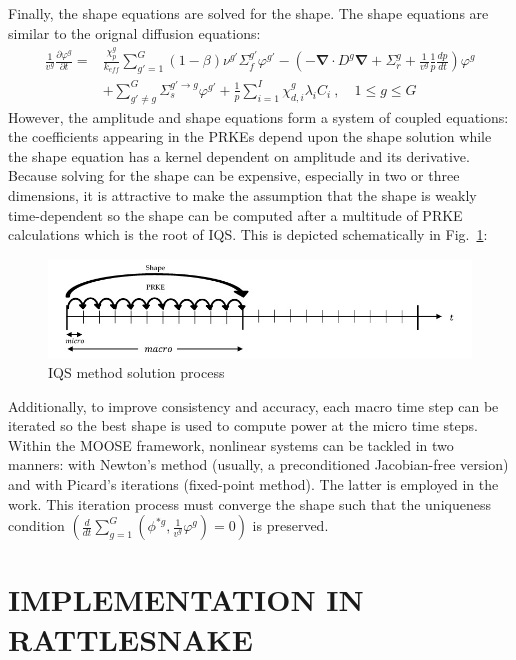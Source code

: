 \documentclass[12pt]{article}
\newcommand{\bs}[1]{\mathbf{#1}}
\renewcommand{\div}{\bs{\nabla}\! \cdot \!}
\newcommand{\grad}{\bs{\nabla}}
\newcommand{\fig}[1]{Fig.~\ref{#1}}                      %
\newcommand{\keff}{k_\textit{eff}}
\begin{document}
Finally, the shape equations are solved for the shape. The shape equations are similar to the orignal diffusion equations:
\begin{align}
\frac{1}{v^g} \frac{\partial \varphi^g }{\partial t} =& \frac{\chi_p^g}{\keff} \sum_{g'=1}^G (1-\beta) \nu^{g'} \Sigma_f^{g'} \varphi^{g'} -  \left( -\div D^g \grad  + \Sigma_r^g + \frac{1}{v^g}\frac{1}{p}\frac{dp}{dt}\right) \varphi^g  \nonumber \\
&  + \sum_{g'\neq g}^G\Sigma_s^{g'\to g} \varphi^{g'}  + \frac{1}{p}\sum_{i=1}^I\chi_{d,i}^g\lambda_i C_i \ , \quad 1 \le g \le G 
\label{eq:shape}
\end{align}
However, the amplitude and shape equations form a system of coupled equations: the coefficients appearing in the PRKEs depend upon the shape solution while the shape equation has a kernel dependent on amplitude and its derivative.  Because solving for the shape can be expensive, especially in two or three dimensions, it is attractive to make the assumption that the shape is weakly time-dependent so the shape can be computed after a multitude of PRKE calculations which is the root of IQS.  This is depicted schematically in \fig{fig:IQS}:
%
\begin{figure}[h]
\includegraphics[width=\linewidth]{figures/IQS_visualization.jpg}
\caption{IQS method solution process}
\label{fig:IQS}
\end{figure}
%

Additionally, to improve consistency and accuracy, each macro time step can be iterated so the best shape is used to compute power at the micro time steps. Within the MOOSE framework,
nonlinear systems can be tackled in two manners: with Newton's method (usually, a preconditioned Jacobian-free version) and with Picard's iterations (fixed-point method). The latter is employed in the work. This iteration process must converge the shape such that the uniqueness condition $(\frac{d}{dt}\sum_{g=1}^G\left(\phi^{*g},\frac{1}{v^g}\varphi^g\right)=0)$ is preserved.

%
\section{IMPLEMENTATION IN RATTLESNAKE}
\label{sect::implementation}
\end{document}
